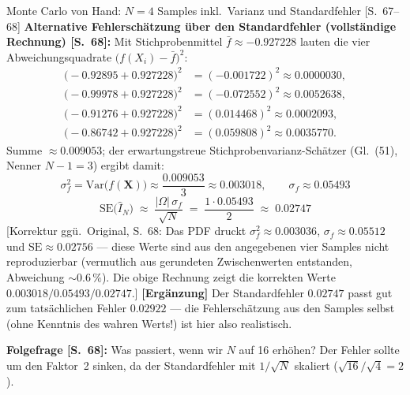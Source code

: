 \begin{bspbox}{Monte Carlo von Hand: $N = 4$ Samples inkl.\ Varianz und Standardfehler [S.~67--68]}
\medskip
\textbf{Alternative Fehlerschätzung über den Standardfehler (vollständige Rechnung)
[S.~68]:} Mit Stichprobenmittel $\bar{f} \approx -0.927228$ lauten die vier
Abweichungsquadrate $\bigl(f(X_i) - \bar{f}\bigr)^2$:
\begin{align*}
  \bigl(-0.92895 + 0.927228\bigr)^2 &= (-0.001722)^2 \approx 0.0000030,\\
  \bigl(-0.99978 + 0.927228\bigr)^2 &= (-0.072552)^2 \approx 0.0052638,\\
  \bigl(-0.91276 + 0.927228\bigr)^2 &= (0.014468)^2 \approx 0.0002093,\\
  \bigl(-0.86742 + 0.927228\bigr)^2 &= (0.059808)^2 \approx 0.0035770.
\end{align*}
Summe $\approx 0.009053$; der erwartungstreue Stichprobenvarianz-Schätzer
(Gl.~(51), Nenner $N - 1 = 3$) ergibt damit:
\[
  \sigma_f^2 = \mathrm{Var}\bigl(f(\mathbf{X})\bigr)
  \approx \frac{0.009053}{3}
  \approx 0.003018,
  \qquad \sigma_f \approx 0.05493
\]
\[
  \mathrm{SE}\bigl(\hat{I}_N\bigr) \;\approx\; \frac{|\Omega|\,\sigma_f}{\sqrt{N}}
  \;=\; \frac{1 \cdot 0.05493}{2} \;\approx\; 0.02747
\]
[Korrektur ggü.\ Original, S.~68: Das PDF druckt $\sigma_f^2 \approx 0.003036$,
$\sigma_f \approx 0.05512$ und $\mathrm{SE} \approx 0.02756$ --- diese Werte sind aus
den angegebenen vier Samples nicht reproduzierbar (vermutlich aus gerundeten
Zwischenwerten entstanden, Abweichung $\sim 0.6\,\%$). Die obige Rechnung zeigt die
korrekten Werte $0.003018 / 0.05493 / 0.02747$.]
\textbf{[Ergänzung]} Der Standardfehler $0.02747$ passt gut zum tatsächlichen Fehler
$0.02922$ --- die Fehlerschätzung aus den Samples selbst (ohne Kenntnis des wahren
Werts!) ist hier also realistisch.

\medskip
\textbf{Folgefrage [S.~68]:} Was passiert, wenn wir $N$ auf 16 erhöhen? Der Fehler
sollte um den Faktor~2 sinken, da der Standardfehler mit $1/\sqrt{N}$ skaliert
($\sqrt{16}/\sqrt{4} = 2$).
\end{bspbox}


